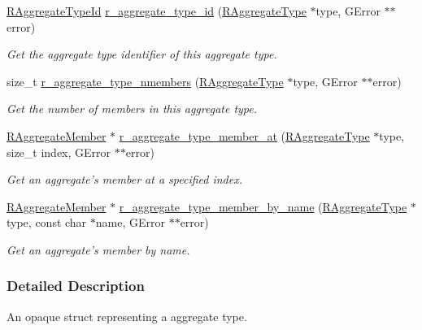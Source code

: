\begin{DoxyCompactItemize}
\item 
\hyperlink{aggregate__type_8h_ae208e3e28b5dcedb640f7f4b0581d61a}{R\-Aggregate\-Type\-Id} \hyperlink{struct_r_aggregate_type_a3ad647b94dd87268b91e92f630b84726}{r\-\_\-aggregate\-\_\-type\-\_\-id} (\hyperlink{struct_r_aggregate_type}{R\-Aggregate\-Type} $\ast$type, G\-Error $\ast$$\ast$error)
\begin{DoxyCompactList}\small\item\em Get the aggregate type identifier of this aggregate type. \end{DoxyCompactList}\item 
size\-\_\-t \hyperlink{struct_r_aggregate_type_a193960ea5996d7c1c7935b1525cf64c9}{r\-\_\-aggregate\-\_\-type\-\_\-nmembers} (\hyperlink{struct_r_aggregate_type}{R\-Aggregate\-Type} $\ast$type, G\-Error $\ast$$\ast$error)
\begin{DoxyCompactList}\small\item\em Get the number of members in this aggregate type. \end{DoxyCompactList}\item 
\hyperlink{struct_r_aggregate_member}{R\-Aggregate\-Member} $\ast$ \hyperlink{struct_r_aggregate_type_aea94153a211184cee889e445a7dd003a}{r\-\_\-aggregate\-\_\-type\-\_\-member\-\_\-at} (\hyperlink{struct_r_aggregate_type}{R\-Aggregate\-Type} $\ast$type, size\-\_\-t index, G\-Error $\ast$$\ast$error)
\begin{DoxyCompactList}\small\item\em Get an aggregate's member at a specified index. \end{DoxyCompactList}\item 
\hyperlink{struct_r_aggregate_member}{R\-Aggregate\-Member} $\ast$ \hyperlink{struct_r_aggregate_type_aaedae83d9a40bc853240408346444d6c}{r\-\_\-aggregate\-\_\-type\-\_\-member\-\_\-by\-\_\-name} (\hyperlink{struct_r_aggregate_type}{R\-Aggregate\-Type} $\ast$type, const char $\ast$name, G\-Error $\ast$$\ast$error)
\begin{DoxyCompactList}\small\item\em Get an aggregate's member by name. \end{DoxyCompactList}\end{DoxyCompactItemize}


\subsubsection{Detailed Description}
An opaque struct representing a aggregate type. 

